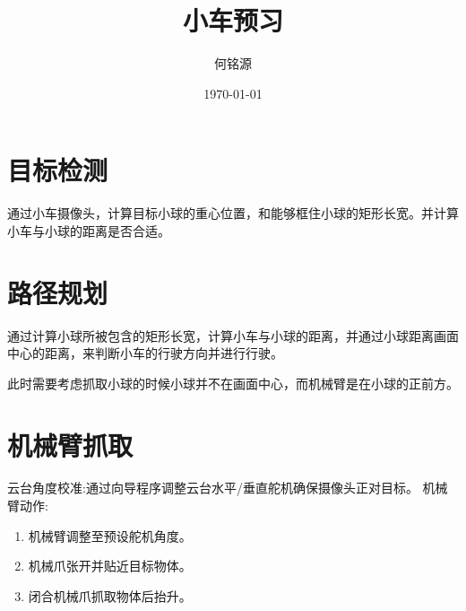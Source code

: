 \documentclass{ctexart}
\title{小车预习}
\author{何铭源}
\date{\today}
\begin{document}
\maketitle
\section{目标检测}
通过小车摄像头，计算目标小球的重心位置，和能够框住小球的矩形长宽。并计算小车与小球的距离是否合适。
\section{路径规划}
通过计算小球所被包含的矩形长宽，计算小车与小球的距离，并通过小球距离画面中心的距离，来判断小车的行驶方向并进行行驶。

此时需要考虑抓取小球的时候小球并不在画面中心，而机械臂是在小球的正前方。
\section{机械臂抓取}
云台角度校准:通过向导程序调整云台水平/垂直舵机确保摄像头正对目标。
机械臂动作:
\begin{enumerate}
    \item 机械臂调整至预设舵机角度。
    \item 机械爪张开并贴近目标物体。
    \item 闭合机械爪抓取物体后抬升。
\end{enumerate}
\end{document}
